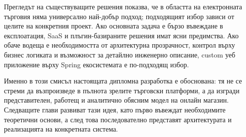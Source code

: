 Прегледът на съществуващите решения показва, че в областта на електронната търговия няма универсално най-добър подход; подходящият избор зависи от целите на конкретния проект. Ако основната задача е бързо въвеждане в експлоатация, SaaS и плъгин-базираните решения имат ясни предимства. Ако обаче водеща е необходимостта от архитектурна прозрачност, контрол върху бизнес логиката и възможност за детайлно инженерно описание, custom уеб приложение върху Spring екосистемата е по-подходящ избор.

Именно в този смисъл настоящата дипломна разработка е обоснована: тя не се стреми да възпроизведе в пълнота зрелите търговски платформи, а да изгради представителен, работещ и аналитично обясним модел на онлайн магазин. Следващите глави развиват тази идея, като първо въвеждат необходимите теоретични основи, а след това последователно представят архитектурата и реализацията на конкретната система.
